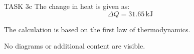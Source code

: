 TASK 3c  
The change in heat is given as:  
\[
\Delta Q = 31.65 \, \text{kJ}
\]  

The calculation is based on the first law of thermodynamics.  

No diagrams or additional content are visible.